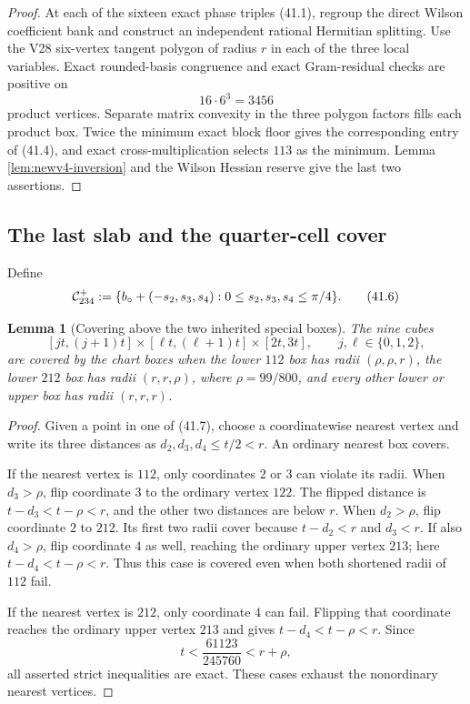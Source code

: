 \documentclass[11pt,oneside]{article}
\newtheorem{lemma}[theorem]{Lemma}
\theoremstyle{definition}
\theoremstyle{remark}
\begin{document}
\begin{proof}
At each of the sixteen exact phase triples (41.1), regroup the
direct Wilson coefficient bank and construct an independent
rational Hermitian splitting.  Use the V28 six-vertex tangent
polygon of radius \(r\) in each of the three local variables.
Exact rounded-basis congruence and exact Gram-residual checks are
positive on
\[
 16\cdot6^3=3456                                       \tag{41.5}
\]
product vertices.  Separate matrix convexity in the three polygon
factors fills each product box.  Twice the minimum exact block
floor gives the corresponding entry of (41.4), and exact
cross-multiplication selects \(113\) as the minimum.  Lemma
\ref{lem:newv4-inversion} and the Wilson Hessian reserve give the
last two assertions.
\end{proof}

\subsection{The last slab and the quarter-cell cover}

Define
\[
 {\cal C}_{234}^{+}:=
 \{b_\circ+(-s_2,s_3,s_4):
          0\le s_2,s_3,s_4\le\pi/4\}.                 \tag{41.6}
\]

\begin{lemma}[Covering above the two inherited special boxes]
\label{lem:newv41-special-cover}
The nine cubes
\[
 [jt,(j+1)t]\times[\ell t,(\ell+1)t]\times[2t,3t],
 \qquad j,\ell\in\{0,1,2\},                            \tag{41.7}
\]
are covered by the chart boxes when the lower \(112\) box has
radii \((\rho,\rho,r)\), the lower \(212\) box has radii
\((r,r,\rho)\), where \(\rho=99/800\), and every other lower or
upper box has radii \((r,r,r)\).
\end{lemma}

\begin{proof}
Given a point in one of (41.7), choose a coordinatewise nearest
vertex and write its three distances as
\(d_2,d_3,d_4\le t/2<r\).  An ordinary nearest box covers.

If the nearest vertex is \(112\), only coordinates \(2\) or \(3\)
can violate its radii.  When \(d_3>\rho\), flip coordinate \(3\)
to the ordinary vertex \(122\).  The flipped distance is
\(t-d_3<t-\rho<r\), and the other two distances are below \(r\).
When \(d_2>\rho\), flip coordinate \(2\) to \(212\).  Its first
two radii cover because \(t-d_2<r\) and \(d_3<r\).  If also
\(d_4>\rho\), flip coordinate \(4\) as well, reaching the ordinary
upper vertex \(213\); here \(t-d_4<t-\rho<r\).  Thus this case is
covered even when both shortened radii of \(112\) fail.

If the nearest vertex is \(212\), only coordinate \(4\) can fail.
Flipping that coordinate reaches the ordinary upper vertex \(213\)
and gives \(t-d_4<t-\rho<r\).  Since
\[
 t<\frac{61123}{245760}<r+\rho,                        \tag{41.8}
\]
all asserted strict inequalities are exact.  These cases exhaust
the nonordinary nearest vertices.
\end{proof}
\end{document}
